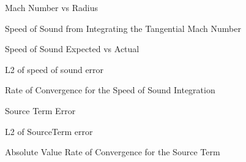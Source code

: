 \documentclass[a4paper]{article}
\begin{document}
\begin{figure}
    \begin{center}
        \scalebox{0.75}{}
    \end{center}
    \caption{Mach Number vs Radius}
\end{figure}

\begin{figure}
    \begin{center}
        \scalebox{0.75}{}
    \end{center}
    \caption{Speed of Sound from Integrating the Tangential Mach Number}
\end{figure}

\begin{figure}
    \begin{center}
        \scalebox{0.75}{}
    \end{center}
    \caption{Speed of Sound Expected vs Actual}
\end{figure}

\begin{figure}
    \begin{center}
        \scalebox{0.75}{}
    \end{center}
    \caption{L2 of speed of sound error}
\end{figure}


\begin{figure}
    \begin{center}
        \scalebox{0.75}{}
    \end{center}
    \caption{Rate of Convergence for the Speed of Sound Integration}
\end{figure}

\begin{figure}
    \begin{center}
        \scalebox{0.75}{}
    \end{center}
    \caption{Source Term Error}
\end{figure}

\begin{figure}
    \begin{center}
        \scalebox{0.75}{}
    \end{center}
    \caption{L2 of SourceTerm error}
\end{figure}

\begin{figure}
   \begin{center}
       \scalebox{0.75}{}
    \end{center}
    \caption{Absolute Value Rate of Convergence for the Source Term}
\end{figure}
\end{document}
